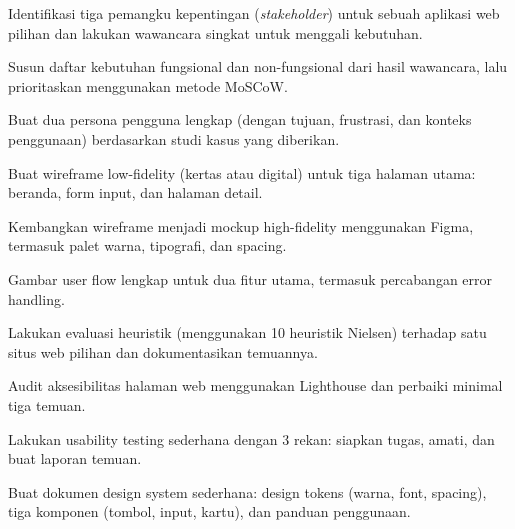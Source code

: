 \documentclass[../main.tex]{subfiles}
\begin{document}
\begin{aktivitas}
  \item Identifikasi tiga pemangku kepentingan (\textit{stakeholder}) untuk sebuah aplikasi web pilihan dan lakukan wawancara singkat untuk menggali kebutuhan.
  \item Susun daftar kebutuhan fungsional dan non-fungsional dari hasil wawancara, lalu prioritaskan menggunakan metode MoSCoW.
  \item Buat dua persona pengguna lengkap (dengan tujuan, frustrasi, dan konteks penggunaan) berdasarkan studi kasus yang diberikan.
  \item Buat wireframe low-fidelity (kertas atau digital) untuk tiga halaman utama: beranda, form input, dan halaman detail.
  \item Kembangkan wireframe menjadi mockup high-fidelity menggunakan Figma, termasuk palet warna, tipografi, dan spacing.
  \item Gambar user flow lengkap untuk dua fitur utama, termasuk percabangan error handling.
  \item Lakukan evaluasi heuristik (menggunakan 10 heuristik Nielsen) terhadap satu situs web pilihan dan dokumentasikan temuannya.
  \item Audit aksesibilitas halaman web menggunakan Lighthouse dan perbaiki minimal tiga temuan.
  \item Lakukan usability testing sederhana dengan 3 rekan: siapkan tugas, amati, dan buat laporan temuan.
  \item Buat dokumen design system sederhana: design tokens (warna, font, spacing), tiga komponen (tombol, input, kartu), dan panduan penggunaan.
\end{aktivitas}
\end{document}

